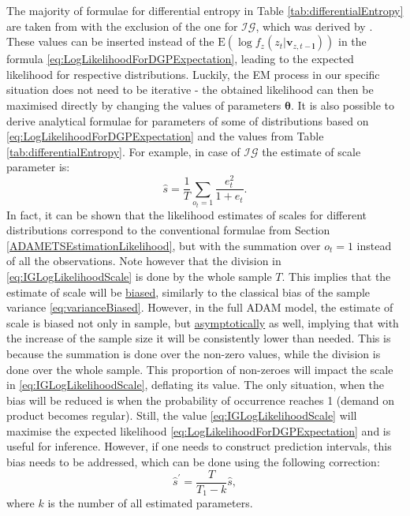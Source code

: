 \documentclass[
]{book}
\theoremstyle{definition}
\theoremstyle{definition}
\theoremstyle{definition}
\theoremstyle{definition}
\theoremstyle{remark}
\begin{document}
The majority of formulae for differential entropy in Table \ref{tab:differentialEntropy} are taken from \citet{WikipediaDifferentialEntropy2021} with the exclusion of the one for \(\mathcal{IG}\), which was derived by \citet{Mudholkar2002}. These values can be inserted instead of the \(\text{E} \left( \log f_z \left(z_{t} | \mathbf{v}_{z,t-\boldsymbol{l}} \right) \right)\) in the formula \eqref{eq:LogLikelihoodForDGPExpectation}, leading to the expected likelihood for respective distributions. Luckily, the EM process in our specific situation does not need to be iterative - the obtained likelihood can then be maximised directly by changing the values of parameters \(\boldsymbol{\theta}\). It is also possible to derive analytical formulae for parameters of some of distributions based on \eqref{eq:LogLikelihoodForDGPExpectation} and the values from Table \ref{tab:differentialEntropy}. For example, in case of \(\mathcal{IG}\) the estimate of scale parameter is:
\begin{equation}
    \hat{s} = \frac{1}{T} \sum_{o_t=1}\frac{e_t^2}{1+e_t}.
    \label{eq:IGLogLikelihoodScale}
\end{equation}
In fact, it can be shown that the likelihood estimates of scales for different distributions correspond to the conventional formulae from Section \ref{ADAMETSEstimationLikelihood}, but with the summation over \(o_t=1\) instead of all the observations. Note however that the division in \eqref{eq:IGLogLikelihoodScale} is done by the whole sample \(T\). This implies that the estimate of scale will be \protect\hyperlink{estimatesPropertiesBias}{biased}, similarly to the classical bias of the sample variance \eqref{eq:varianceBiased}. However, in the full ADAM model, the estimate of scale is biased not only in sample, but \protect\hyperlink{asymptoticNormality}{asymptotically} as well, implying that with the increase of the sample size it will be consistently lower than needed. This is because the summation is done over the non-zero values, while the division is done over the whole sample. This proportion of non-zeroes will impact the scale in \eqref{eq:IGLogLikelihoodScale}, deflating its value. The only situation, when the bias will be reduced is when the probability of occurrence reaches 1 (demand on product becomes regular). Still, the value \eqref{eq:IGLogLikelihoodScale} will maximise the expected likelihood \eqref{eq:LogLikelihoodForDGPExpectation} and is useful for inference. However, if one needs to construct prediction intervals, this bias needs to be addressed, which can be done using the following correction:
\begin{equation}
    \hat{s}^\prime = \frac{T}{T_1-k} \hat{s},
    \label{eq:scaleFixed}
\end{equation}
where \(k\) is the number of all estimated parameters.
\end{document}
